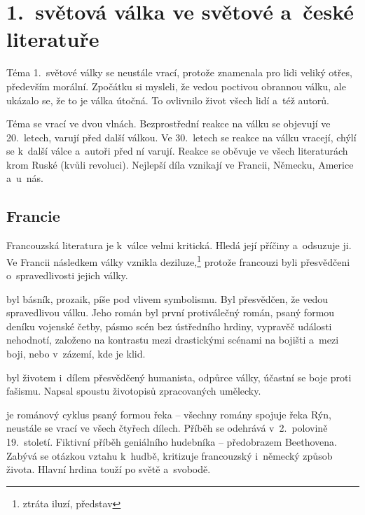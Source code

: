 \chapter{1.~světová válka ve světové a~české literatuře} %

Téma 1.~světové války se neustále vrací, protože znamenala pro lidi
veliký otřes, především morální. Zpočátku si mysleli, že vedou poctivou
obrannou válku, ale ukázalo se, že to je válka útočná. To ovlivnilo
život všech lidí a~též autorů.

Téma se vrací ve dvou vlnách. Bezprostřední reakce na válku se objevují
ve 20.~letech, varují před další válkou. Ve 30.~letech se reakce na
válku vracejí, chýlí se k~další válce a~autoři před ní varují. Reakce se
oběvuje ve všech literaturách krom Ruské (kvůli revoluci).
Nejlepší díla vznikají ve Francii, Německu, Americe a~u~nás.

\section{Francie}
Francouzská literatura je k~válce velmi kritická. Hledá její příčiny
a~odsuzuje ji. Ve Francii následkem války vznikla deziluze,\footnote{ztráta iluzí, představ}
protože francouzi byli přesvědčeni o~spravedlivosti jejich války.

\delic

 byl básník, prozaik, píše pod vlivem symbolismu.
Byl přesvědčen, že vedou spravedlivou válku.  Jeho román  byl
první protiválečný román, psaný formou deníku vojenské četby, pásmo scén
bez ústředního hrdiny, vypravěč události nehodnotí, založeno na
kontrastu mezi drastickými scénami na bojišti a~mezi boji, nebo
v~zázemí, kde je klid.

\delic

 byl životem i~dílem přesvědčený humanista,
odpůrce války, účastní se boje proti fašismu. Napsal spoustu životopisů
zpracovaných umělecky. 

 je románový cyklus psaný formou řeka -- všechny
romány spojuje řeka Rýn, neustále se vrací ve všech čtyřech dílech.
Příběh se odehrává v~2.~polovině 19.~století. Fiktivní příběh geniálního
hudebníka -- předobrazem Beethovena. Zabývá se otázkou vztahu k~hudbě,
kritizuje francouzský i~německý způsob života. Hlavní hrdina touží po
světě a~svobodě.

